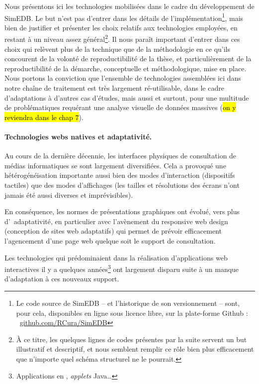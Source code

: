 Nous présentons ici les technologies mobilisées dans le cadre du développement de SimEDB.
Le but n'est pas d'entrer dans les détails de l'implémentation\footnote{
	Le code source de SimEDB -- et l'historique de son versionnement -- sont, pour cela, disponibles en ligne sous licence libre, sur la plate-forme Github : 
	\faGithub~\href{https://github.com/RCura/SimEDB}{github.com/RCura/SimEDB}
}, mais bien de justifier et présenter les choix relatifs aux technologies employées, en restant à un niveau assez général\footnote{
	À ce titre, les quelques lignes de codes présentes par la suite servent un but illustratif et descriptif, et nous semblent remplir ce rôle bien plus efficacement que n'importe quel schéma structurel ne le pourrait.
}.
Il nous paraît important d'entrer dans ces choix qui relèvent plus de la technique que de la méthodologie en ce qu'ils concourent de la volonté de reproductibilité de la thèse, et particulièrement de la reproductibilité de la démarche, conceptuelle et méthodologique, mise en place.
Nous portons la conviction que l'ensemble de technologies assemblées ici dans notre \og chaîne de traitement\fg{} est très largement ré-utilisable, dans le cadre d'adaptations à d'autres cas d'études, mais aussi et surtout, pour une multitude de problématiques requérant une analyse visuelle de données massives (\hl{on y reviendra dans le chap 7}).

\paragraph{Technologies webs \og natives\fg{}  et adaptativité.}

Au cours de la dernière décennie, les interfaces physiques de consultation de médias informatiques se sont largement diversifiées.
Cela a provoqué une hétérogénéisation importante aussi bien des modes d'interaction (dispositifs \og tactiles\fg{}) que des modes d'affichages (les tailles et résolutions des écrans n'ont jamais été aussi diverses et imprévisibles).

En conséquence, les normes de présentations graphiques ont évolué, vers plus d'\og~adaptativité\fg{}, en particulier avec l'avènement du \og responsive web design\fg{} (\og conception de sites web adaptatifs\fg{}) qui permet de prévoir efficacement l'agencement d'une page web quelque soit le support de consultation.

Les technologies qui prédominaient dans la réalisation d'applications web interactives il y a quelques années\footnote{
	Applications en ,  \textit{applets} Java\ldots
}  ont largement disparu suite à un manque d'adaptation à ces nouveaux support.

